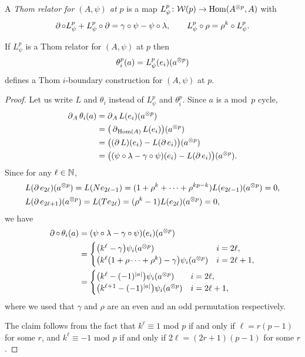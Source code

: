A \textit{Thom relator for $(A, \psi)$ at $p$} is a map $L_\psi^p \colon \mathcal{W}(p) \to \mathrm{Hom}(A^{\otimes p}, A)$ with
\[
\operatorname{\partial} \mathbin{\circ} L_\psi^p + L_\psi^p \mathbin{\circ} \operatorname{\partial} = \gamma \mathbin{\circ} \psi - \psi \mathbin{\circ} \lambda, \qquad
L_\psi^p \mathbin{\circ} \rho = \rho^k \mathbin{\circ} L_\psi^p.
\]


\begin{theorem}
	If $L_\psi^p$ is a Thom relator for $(A, \psi)$ at $p$ then
	\[
	\theta_i^p(a) = L_\psi^p(e_i)(a^{\otimes p})
	\]
	defines a Thom $i$-boundary construction for $(A, \psi)$ at $p$.
\end{theorem}

\begin{proof}
	Let us write $L$ and $\theta_i$ instead of $L_\psi^p$ and $\theta_i^p$.
	Since $a$ is a mod~$p$ cycle,
	\begin{align*}
		\operatorname{\partial}_A \theta_i(a) & =
		\operatorname{\partial}_A L(e_i)(a^{\otimes p}) \\ & =
		\big(\operatorname{\partial}_{\mathrm{Hom}(A)} L(e_i)\big)(a^{\otimes p}) \\ & =
		\big((\operatorname{\partial} L)(e_i) - L(\operatorname{\partial} e_i)\big)(a^{\otimes p}) \\ & =
		\big((\psi \mathbin{\circ} \lambda - \gamma \mathbin{\circ} \psi)(e_i) - L(\operatorname{\partial} e_i)\big) (a^{\otimes p}).
	\end{align*}
	Since for any $\ell \in \mathbb{N}$,
	\begin{align*}
		&L(\operatorname{\partial} e_{2\ell})(a^{\otimes p}) = L(N e_{2\ell-1}) = (1+\rho^k+\dots+\rho^{kp-k})L(e_{2\ell-1}) (a^{\otimes p}) = 0, \\
		&L(\operatorname{\partial} e_{2\ell+1})(a^{\otimes p}) = L(T e_{2\ell}) = (\rho^k - 1) L(e_{2\ell})(a^{\otimes p}) = 0,
	\end{align*}
	we have
	\begin{align*}
		\operatorname{\partial} \mathbin{\circ}\, \theta_i(a) & =
		(\psi \mathbin{\circ} \lambda - \gamma \mathbin{\circ} \psi)(e_i)(a^{\otimes p}) \\ & =
		\begin{cases}
			\big(k^\ell - \gamma\big) \psi_i(a^{\otimes p}) & i = 2\ell, \\
			\big(k^\ell (1+\rho\dots+\rho^k) - \gamma\big) \psi_i(a^{\otimes p}) & i = 2\ell+1,
		\end{cases}
		\\ & =
		\begin{cases}
			\big(k^\ell - (-1)^{\lvert a\rvert}\big) \psi_i(a^{\otimes p}) & i = 2\ell, \\
			\big(k^{\ell+1} - (-1)^{\lvert a\rvert}\big) \psi_i(a^{\otimes p}) & i = 2\ell+1,
		\end{cases}
	\end{align*}
	where we used that $\gamma$ and $\rho$ are an even and an odd permutation respectively.

	The claim follows from the fact that $k^\ell \equiv 1$ mod $p$ if and only if $\ell = r(p-1)$ for some $r$, and $k^\ell \equiv -1$ mod $p$ if and only if $2\ell = (2r+1)(p-1)$ for some $r$.
\end{proof}


